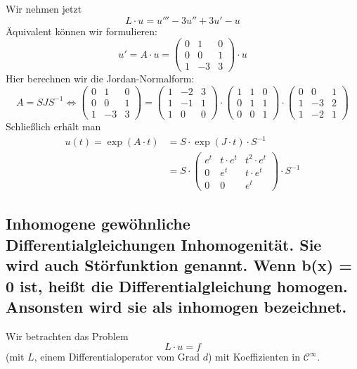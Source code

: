 \documentclass[main.tex]{subfiles}
\begin{document}
\begin{Beispiel}
  Wir nehmen jetzt
  $$L \cdot u = u''' - 3 u'' + 3u' -u$$
  Äquivalent können wir formulieren:
  $$u' = A \cdot u = \begin{pmatrix}
    0 & 1 & 0 \\ 0 & 0 & 1 \\ 1 & -3 & 3
  \end{pmatrix} \cdot u$$
  Hier berechnen wir die Jordan-Normalform:
  $$A = SJS^{-1} \Leftrightarrow
  \begin{pmatrix}
    0 & 1 & 0 \\ 0 & 0 & 1 \\ 1 & -3 & 3
  \end{pmatrix} = \begin{pmatrix}
    1 & -2 & 3 \\ 1 & -1 & 1 \\ 1 & 0 & 0
  \end{pmatrix} \cdot \begin{pmatrix}
    1 & 1 & 0 \\ 0 & 1 & 1 \\ 0 & 0 & 1
  \end{pmatrix} \cdot \begin{pmatrix}
    0 & 0 & 1 \\ 1 & -3 & 2 \\ 1 & -2 & 1
  \end{pmatrix}$$
  Schließlich erhält man
  $$\begin{aligned}
    u(t) = \exp(A \cdot t) & = S \cdot \exp(J \cdot t) \cdot S^{-1} \\
    & = S \cdot \begin{pmatrix}
      e^t & t \cdot e^t & t^2 \cdot e^t \\ 0 & e^t & t \cdot e^t \\ 0 & 0 & e^t
    \end{pmatrix} \cdot S^{-1}
  \end{aligned}$$
\end{Beispiel}

\subsection{Inhomogene gewöhnliche Differentialgleichungen Inhomogenität. Sie wird auch Störfunktion genannt. Wenn b(x) = 0 ist, heißt die Differentialgleichung homogen. Ansonsten wird sie als inhomogen bezeichnet.}

Wir betrachten das Problem
$$L \cdot u = f$$
(mit $L$, einem Differentialoperator vom Grad $d$) mit Koeffizienten in $\mathcal{C}^\infty$.
\end{document}
